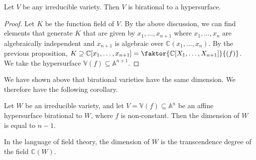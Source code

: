 \begin{corollary}
    Let \( V \) be any irreducible variety.
    Then \( V \) is birational to a hypersurface.
\end{corollary}
\begin{proof}
    Let \( K \) be the function field of \( V \).
    By the above discussion, we can find elements that generate \( K \) that are given by \( x_1, \dots, x_{n+1} \) where \( x_1, \dots, x_n \) are algebraically independent and \( x_{n+1} \) is algebraic over \( \mathbb C(x_1, \dots, x_n) \).
    By the previous proposition, \( K \supseteq \mathbb C[x_1, \dots, x_{n+1}] = \faktor{\mathbb C[X_1, \dots, X_{n+1}]}{(f)} \).
    We take the hypersurface \( \mathbb V(f) \subseteq \mathbb A^{n+1} \).
\end{proof}
We have shown above that birational varieties have the same dimension.
We therefore have the following corollary.
\begin{corollary}
    Let \( W \) be an irreducible variety, and let \( V = \mathbb V(f)\subseteq \mathbb A^n \) be an affine hypersurface birational to \( W \), where \( f \) is non-constant.
    Then the dimension of \( W \) is equal to \( n - 1 \).
\end{corollary}
In the language of field theory, the dimension of \( W \) is the transcendence degree of the field \( \mathbb C(W) \).


